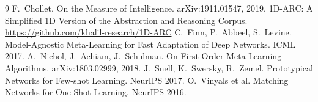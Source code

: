 \documentclass[11pt,a4paper]{article}
\begin{document}
\begin{thebibliography}{9}
 F.~Chollet. On the Measure of Intelligence. arXiv:1911.01547, 2019.
 1D-ARC: A Simplified 1D Version of the Abstraction and Reasoning Corpus. \url{https://github.com/khalil-research/1D-ARC}
 C.~Finn, P.~Abbeel, S.~Levine. Model-Agnostic Meta-Learning for Fast Adaptation of Deep Networks. ICML 2017.
 A.~Nichol, J.~Achiam, J.~Schulman. On First-Order Meta-Learning Algorithms. arXiv:1803.02999, 2018.
 J.~Snell, K.~Swersky, R.~Zemel. Prototypical Networks for Few-shot Learning. NeurIPS 2017.
 O.~Vinyals et al. Matching Networks for One Shot Learning. NeurIPS 2016.
\end{thebibliography}
\end{document}
